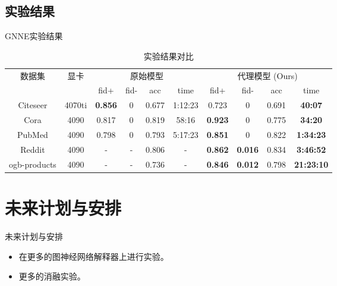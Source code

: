 \documentclass[UTF8, aspectratio=169,10pt]{beamer}%
\numberwithin{equation}{section}
\numberwithin{figure}{section}
\numberwithin{table}{section}
\theoremstyle{definition}
\begin{document}
\subsection{实验结果}
\begin{frame}{GNNE实验结果}
\begin{table}[htbp]
	\centering
	\caption{实验结果对比}
	\begin{tabular}{cccccccccc}
		\toprule[1.5pt]
		\multirow{2}{*}{数据集} & \multirow{2}{*}{显卡} & \multicolumn{4}{c}{原始模型} & \multicolumn{4}{c}{代理模型 (Ours)} \\
		\cmidrule(lr){3-6} \cmidrule(lr){7-10}
		& & fid+ & fid- & acc & time & fid+ & fid- & acc & time \\
		\midrule
		Citeseer & 4070ti & \textbf{0.856} & 0 & 0.677 & 1:12:23 & 0.723 & 0 & 0.691 & \textbf{40:07} \\
		Cora & 4090 & 0.817 & 0 & 0.819 & 58:16
		 & \textbf{0.923} & 0 & 0.775 & \textbf{34:20} \\
		PubMed & 4090 & 0.798 & 0 & 0.793 & 5:17:23
		 & \textbf{0.851} & 0 & 0.822 & \textbf{1:34:23} \\
		Reddit & 4090 & - & - & 0.806 & -
		 & \textbf{0.862} & \textbf{0.016} & 0.834 & \textbf{3:46:52} \\
		ogb-products & 4090 & - & - & 0.736 &- & \textbf{0.846} & \textbf{0.012} & 0.798 & \textbf{21:23:10} \\
		\bottomrule[1.5pt]
	\end{tabular}
\end{table}
	
\end{frame}





\section{未来计划与安排}
\begin{frame}{未来计划与安排}
	\begin{itemize}
		\item 在更多的图神经网络解释器上进行实验。
		\item 更多的消融实验。
	\end{itemize}
\end{frame}
\end{document}

